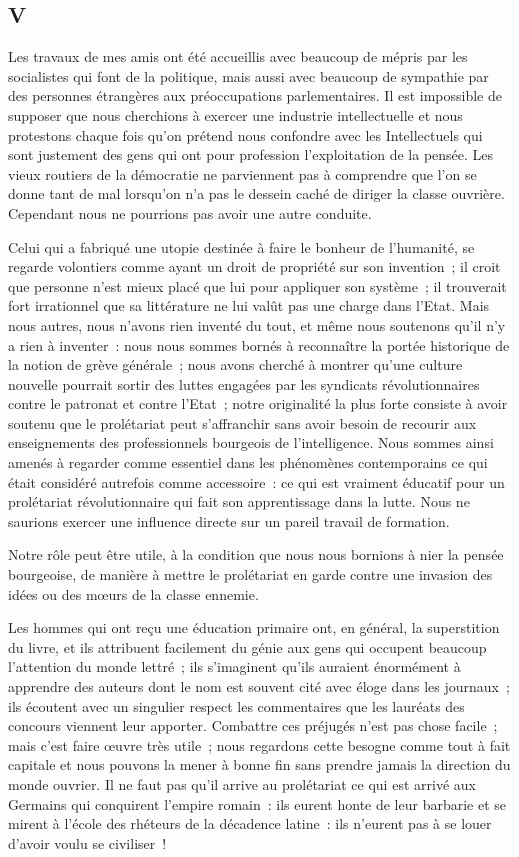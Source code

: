 \documentclass[french,twoside]{book} %
\begin{document}
 \subsection[{V}]{V}
\noindent Les travaux de mes amis ont été accueillis avec beaucoup de mépris par les socialistes qui font de la politique, mais aussi avec beaucoup de sympathie par des personnes étrangères aux préoccupations parlementaires. Il est impossible de supposer que nous cherchions à exercer une industrie intellectuelle et nous protestons chaque fois qu’on prétend nous confondre avec les Intellectuels qui sont justement des gens qui ont pour profession l’exploitation de la pensée. Les vieux routiers de la démocratie ne parviennent pas à comprendre que l’on se donne tant de mal lorsqu’on n’a pas le dessein caché de diriger la classe ouvrière. Cependant nous ne pourrions pas avoir une autre conduite.\par
Celui qui a fabriqué une utopie destinée à faire le bonheur de l’humanité, se regarde volontiers comme ayant un droit de propriété sur son invention ; il croit que personne n’est mieux placé que lui pour appliquer son système ; il trouverait fort irrationnel que sa littérature ne lui valût pas une charge dans l’Etat. Mais nous autres, nous n’avons rien inventé du tout, et même nous soutenons qu’il n’y a rien à inventer : nous nous sommes bornés à reconnaître la portée historique de la notion de grève générale ; nous avons cherché à montrer  qu’une culture nouvelle pourrait sortir des luttes engagées par les syndicats révolutionnaires contre le patronat et contre l’Etat ; notre originalité la plus forte consiste à avoir soutenu que le prolétariat peut s’affranchir sans avoir besoin de recourir aux enseignements des professionnels bourgeois de l’intelligence. Nous sommes ainsi amenés à regarder comme essentiel dans les phénomènes contemporains ce qui était considéré autrefois comme accessoire : ce qui est vraiment éducatif pour un prolétariat révolutionnaire qui fait son apprentissage dans la lutte. Nous ne saurions exercer une influence directe sur un pareil travail de formation.\par
Notre rôle peut être utile, à la condition que nous nous bornions à nier la pensée bourgeoise, de manière à mettre le prolétariat en garde contre une invasion des idées ou des mœurs de la classe ennemie.\par
Les hommes qui ont reçu une éducation primaire ont, en général, la superstition du livre, et ils attribuent facilement du génie aux gens qui occupent beaucoup l’attention du monde lettré ; ils s’imaginent qu’ils auraient énormément à apprendre des auteurs dont le nom est souvent cité avec éloge dans les journaux ; ils écoutent avec un singulier respect les commentaires que les lauréats des concours viennent leur apporter. Combattre ces préjugés n’est pas chose facile ; mais c’est faire œuvre très utile ; nous regardons cette besogne comme tout à fait capitale et nous pouvons la mener à bonne fin sans prendre jamais la direction du monde ouvrier. Il ne faut pas qu’il arrive au prolétariat ce qui est arrivé aux Germains qui conquirent l’empire romain : ils eurent honte de leur barbarie et se mirent à l’école des rhéteurs  de la décadence latine : ils n’eurent pas à se louer d’avoir voulu se civiliser !\par
\end{document}

